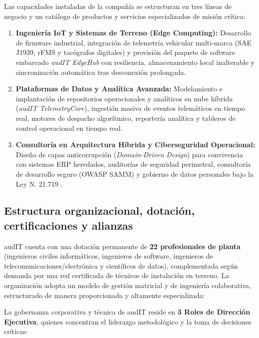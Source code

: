 Las capacidades instaladas de la compañía se estructuran en tres líneas de negocio y un catálogo de productos y servicios especializados de misión crítica:

\begin{enumerate}
    \item \textbf{Ingeniería IoT y Sistemas de Terreno (Edge Computing):} Desarrollo de firmware industrial, integración de telemetría vehicular multi-marca (SAE J1939, rFMS y tacógrafos digitales) y provisión del paquete de software embarcado \emph{audIT EdgeHub} con resiliencia, almacenamiento local inalterable y sincronización automática tras desconexión prolongada.
    \item \textbf{Plataformas de Datos y Analítica Avanzada:} Modelamiento e implantación de repositorios operacionales y analíticos en nube híbrida (\emph{audIT TelemetryCore}), ingestión masiva de eventos telemáticos en tiempo real, motores de despacho algorítmico, reportería analítica y tableros de control operacional en tiempo real.
    \item \textbf{Consultoría en Arquitectura Híbrida y Ciberseguridad Operacional:} Diseño de capas anticorrupción (\emph{Domain-Driven Design}) para convivencia con sistemas ERP heredados, auditorías de seguridad perimetral, consultoría de desarrollo seguro (OWASP SAMM) y gobierno de datos personales bajo la Ley N.\textordmasculine{} 21.719 \parencite{ley21719}.
\end{enumerate}

\subsection{Estructura organizacional, dotación, certificaciones y alianzas}

audIT cuenta con una dotación permanente de \textbf{22 profesionales de planta} (ingenieros civiles informáticos, ingenieros de software, ingenieros de telecomunicaciones/electrónica y científicos de datos), complementada según demanda por una red certificada de técnicos de instalación en terreno. La organización adopta un modelo de gestión matricial y de ingeniería colaborativa, estructurado de manera proporcionada y altamente especializada:


La gobernanza corporativa y técnica de audIT reside en \textbf{3 Roles de Dirección Ejecutiva}, quienes concentran el liderazgo metodológico y la toma de decisiones críticas:

